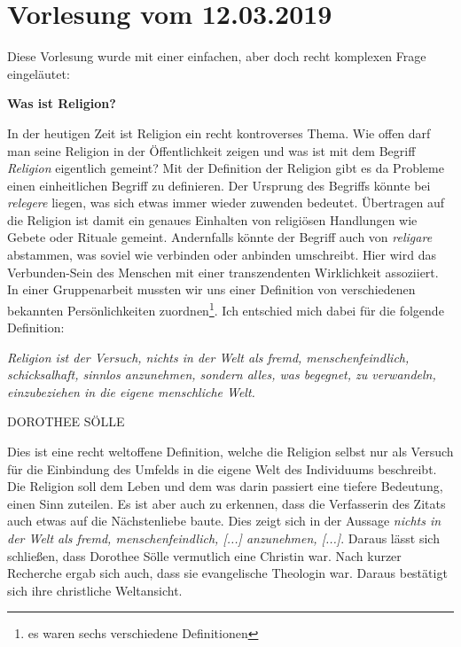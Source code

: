\section{Vorlesung vom 12.03.2019}
Diese Vorlesung wurde mit einer einfachen, aber doch recht komplexen Frage eingeläutet:\\

\begin{center}
	\textbf{\large{\glqq Was ist Religion?\grqq}}
\end{center}

In der heutigen Zeit ist Religion ein recht kontroverses Thema. Wie offen darf man seine Religion in der Öffentlichkeit zeigen und was ist mit dem Begriff \textit{Religion} eigentlich gemeint? Mit der Definition der Religion gibt es da Probleme einen einheitlichen Begriff zu definieren. Der Ursprung des Begriffs könnte bei \textit{relegere} liegen, was sich etwas immer wieder zuwenden bedeutet. Übertragen auf die Religion ist damit ein genaues Einhalten von religiösen Handlungen wie Gebete oder Rituale gemeint. Andernfalls könnte der Begriff auch von \textit{religare} abstammen, was soviel wie verbinden oder anbinden umschreibt. Hier wird das Verbunden-Sein des Menschen mit einer transzendenten Wirklichkeit assoziiert. \\

In einer Gruppenarbeit mussten wir uns einer Definition von verschiedenen bekannten Persönlichkeiten zuordnen\footnote{es waren sechs verschiedene Definitionen}. Ich entschied mich dabei für die folgende Definition:\\

\begin{center}
	\textit{\glqq Religion ist der Versuch, nichts in der Welt als fremd, 						menschenfeindlich, schicksalhaft, sinnlos anzunehmen, sondern alles, was 					begegnet, zu verwandeln, einzubeziehen in die eigene menschliche Welt.\grqq}
\end{center}
\begin{flushright}
	DOROTHEE SÖLLE\\
\end{flushright}

Dies ist eine recht weltoffene Definition, welche die Religion selbst nur als Versuch für die Einbindung des Umfelds in die eigene Welt des Individuums beschreibt. Die Religion soll dem Leben und dem was darin passiert eine tiefere Bedeutung, einen Sinn zuteilen. Es ist aber auch zu erkennen, dass die Verfasserin des Zitats auch etwas auf die Nächstenliebe baute. Dies zeigt sich in der Aussage \textit{\glqq [...] nichts in der Welt als fremd, menschenfeindlich, [...] anzunehmen, [...]\grqq}. Daraus lässt sich schließen, dass Dorothee Sölle vermutlich eine Christin war. Nach kurzer Recherche ergab sich auch, dass sie evangelische Theologin war. Daraus bestätigt sich ihre christliche Weltansicht.\\

